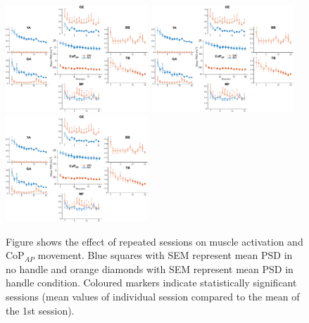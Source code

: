 \documentclass[final,5p,twocolumn]{elsarticle}
\begin{document}
\begin{figure}
	\begin{center}
		\includegraphics[height=4cm]{images/meanErrorBarsAll-1.pdf}
		\includegraphics[height=4cm]{images/meanErrorBarsAll-2.pdf}
		\includegraphics[height=4cm]{images/meanErrorBarsAll-3.pdf}
		\caption{Figure shows the effect of repeated sessions on muscle activation and CoP$_{AP}$ movement. Blue squares with SEM represent mean PSD in no handle and orange diamonds with SEM represent mean PSD in handle condition. Coloured markers indicate statistically significant sessions (mean values of individual session compared to the mean of the 1st session).}
		\label{fig:meanErrorBars}
	\end{center}
\end{figure}
\end{document}
